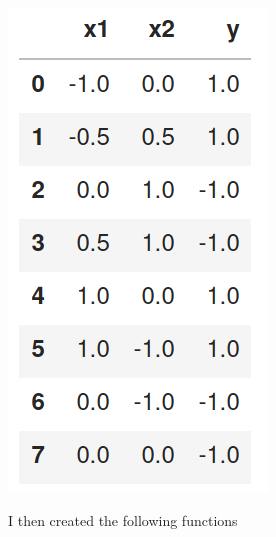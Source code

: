 \documentclass[twoside,10pt]{article}
\begin{document}
\begin{enumerate}
\begin{enumerate}
\includegraphics[scale=0.3]{adaboost_points}

\clearpage

I then created the following functions


\end{enumerate}
\end{enumerate}
\end{document}

